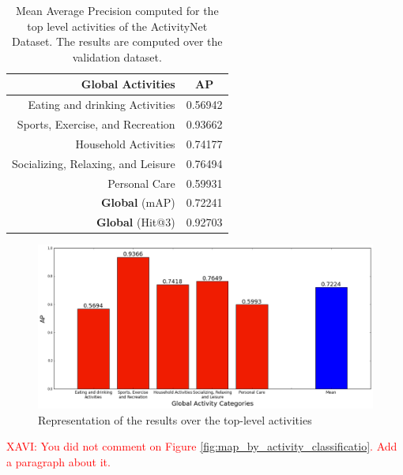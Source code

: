 \begin{table}[H]
\begin{center}
\begin{tabular}{|r|c|}
\hline
\textbf{Global Activities} & \textbf{AP} \\
\hline\hline
Eating and drinking Activities & 0.56942 \\
Sports, Exercise, and Recreation & 0.93662 \\
Household Activities & 0.74177 \\
Socializing, Relaxing, and Leisure & 0.76494 \\
Personal Care & 0.59931 \\
\hline\hline
\textbf{Global} (mAP) & 0.72241 \\
\textbf{Global} (Hit@3) & 0.92703 \\
\hline
\end{tabular}
\end{center}
\caption{Mean Average Precision computed for the top level activities of the ActivityNet Dataset. The results are computed over the validation dataset.}
\label{table:top_level_classification_ap}
\end{table}

\begin{figure}[H]
\begin{center}
\includegraphics[width=1\linewidth]{img/results/top_activities_classification_ap}
\end{center}
\caption{Representation of the results over the top-level activities}
\label{fig:top_level_classification_ap}
\end{figure}


\textcolor{red}{XAVI: You did not comment on Figure \ref{fig:map_by_activity_classificatio}. Add a paragraph about it.}

